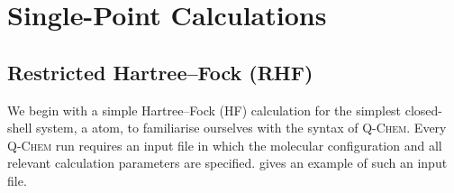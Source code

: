 \renewcommand*{\codelocation}{codesnippets/singlepoint}

\section{Single-Point Calculations}

		\subsection{Restricted Hartree--Fock (RHF)}
	
		We begin with a simple Hartree--Fock (HF) calculation for the simplest closed-shell system, a  atom, to familiarise ourselves with the syntax of \textsc{Q-Chem}.
		Every \textsc{Q-Chem} run requires an input file in which the molecular configuration and all relevant calculation parameters are specified.
		 gives an example of such an input file.
			
		
